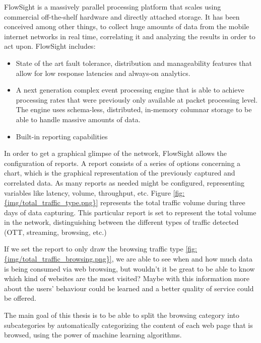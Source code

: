 
FlowSight\cite{flowsight} is a massively parallel processing platform that scales using commercial off-the-shelf hardware and directly attached storage. It has been conceived among other things, to collect
huge amounts of data from the mobile internet networks in real time, correlating it and analyzing the results in order to act upon. FlowSight includes:
\begin{itemize}
  \item{State of the art fault tolerance, distribution and manageability features that allow for low response latencies and always-on analytics.}
  \item{A next generation complex event processing engine that is able to achieve processing rates that were previously only available at packet processing level. The engine uses schema-less, 
        distributed, in-memory columnar storage to be able to handle massive amounts of data.}
  \item{Built-in reporting capabilities}
\end{itemize}
In order to get a graphical glimpse of the network, FlowSight allows the configuration of reports. A report consists of a series of options concerning a chart, which is the graphical representation
of the previously captured and correlated data. As many reports as needed might be configured, representing variables like latency, volume, throughput, etc.   
Figure \ref{fig:{img/total_traffic_type.png}} represents the total traffic volume during three days of data capturing. This particular report is set to represent the total volume in the network, 
distinguishing between the different types of traffic detected (OTT, streaming, browsing, etc.)

If we set the report to only draw the browsing traffic type \ref{fig:{img/total_traffic_browsing.png}}, we are able to see when and how much data is being consumed via web browsing, but wouldn't it be 
great to be able to know which kind of websites are the most visited? Maybe with this information more about the users' behaviour could be learned and a better quality of service could be offered.


The main goal of this thesis is to be able to split the browsing category into subcategories by automatically categorizing the content of each web page that is browsed, using the power of machine learning
algorithms.



